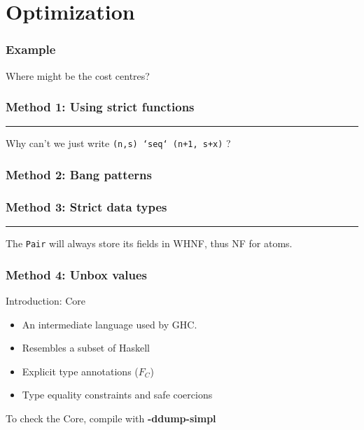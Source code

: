 \documentclass{beamer}
\newcommand{\inlinehaskell}[1]{\texttt{#1}}
\newcommand{\inlineshell}[1]{\textcolor{shellcolor}{\textbf{#1}}}
\begin{document}
\section{Optimization}

\begin{frame}
\frametitle{Example}
Where might be the cost centres?
\newline
{}
\end{frame}


\begin{frame}
\frametitle{Method 1: Using strict functions}
\par\noindent\rule{0.85\textwidth}{1.0pt}
\newline\newline
Why can't we just write \inlinehaskell{(n,s) `seq` (n+1, s+x)} ?
\end{frame}


\begin{frame}
\frametitle{Method 2: Bang patterns}
\end{frame}


\begin{frame}
\frametitle{Method 3: Strict data types}
\par\noindent\rule{0.85\textwidth}{1.0pt}
\newline\newline
The \inlinehaskell{Pair} will always store its fields in WHNF, thus NF for atoms.
\end{frame}


\begin{frame}
\frametitle{Method 4: Unbox values}
Introduction: Core
\begin{itemize}
    \item An intermediate language used by GHC.
    \item Resembles a subset of Haskell
    \item Explicit type annotations ($F_C$)
    \item Type equality constraints and safe coercions
\end{itemize}
\bigskip
To check the Core, compile with \inlineshell{-ddump-simpl}
\end{frame}
\end{document}
